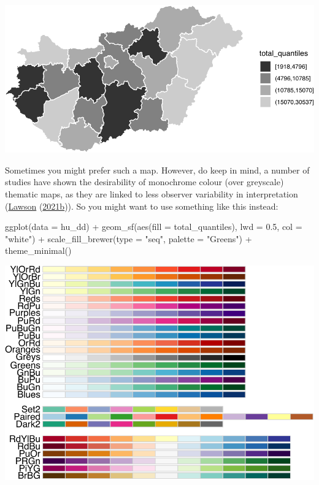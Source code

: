 \documentclass[
]{book}
\newenvironment{Shaded}{\begin{snugshade}}{\end{snugshade}}
\newcommand{\AttributeTok}[1]{\textcolor[rgb]{0.77,0.63,0.00}{#1}}
\newcommand{\FloatTok}[1]{\textcolor[rgb]{0.00,0.00,0.81}{#1}}
\newcommand{\FunctionTok}[1]{\textcolor[rgb]{0.00,0.00,0.00}{#1}}
\newcommand{\NormalTok}[1]{#1}
\newcommand{\SpecialCharTok}[1]{\textcolor[rgb]{0.00,0.00,0.00}{#1}}
\newcommand{\StringTok}[1]{\textcolor[rgb]{0.31,0.60,0.02}{#1}}
\begin{document}
\includegraphics{crime_mapping_files/figure-latex/greyscaletestsmap-1.pdf}

Sometimes you might prefer such a map. However, do keep in mind, a number of studies have shown the desirability of monochrome colour (over greyscale) thematic maps, as they are linked to less observer variability in interpretation (\protect\hyperlink{ref-Lawson_2006}{Lawson} (\protect\hyperlink{ref-Lawson_2006}{2021b})). So you might want to use something like this instead:

\begin{Shaded}
\begin{Highlighting}[]
\FunctionTok{ggplot}\NormalTok{(}\AttributeTok{data =}\NormalTok{ hu\_dd) }\SpecialCharTok{+} 
  \FunctionTok{geom\_sf}\NormalTok{(}\FunctionTok{aes}\NormalTok{(}\AttributeTok{fill =}\NormalTok{ total\_quantiles), }\AttributeTok{lwd =} \FloatTok{0.5}\NormalTok{, }\AttributeTok{col =} \StringTok{"white"}\NormalTok{) }\SpecialCharTok{+} 
  \FunctionTok{scale\_fill\_brewer}\NormalTok{(}\AttributeTok{type =} \StringTok{"seq"}\NormalTok{, }\AttributeTok{palette =} \StringTok{"Greens"}\NormalTok{) }\SpecialCharTok{+} 
  \FunctionTok{theme\_minimal}\NormalTok{()}
\end{Highlighting}
\end{Shaded}

\includegraphics{crime_mapping_files/figure-latex/unnamed-chunk-158-1.pdf}
\end{document}
